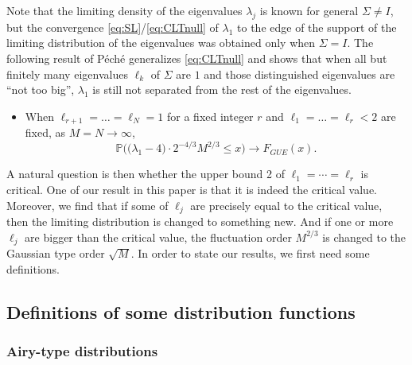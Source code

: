 \documentclass[11pt]{article}
\begin{document}
Note that the limiting density of the eigenvalues $\lambda_j$ is known for
general
$\Sigma \neq I$, but
the convergence \eqref{eq:SL}/\eqref{eq:CLTnull} of $\lambda_1$ to the edge of
the support of the limiting distribution of the eigenvalues
was obtained only when $\Sigma=I$.
The following result of P{\'e}ch{\'e} \cite{Sandrine} generalizes
\eqref{eq:CLTnull}
and shows that when
all but finitely many eigenvalues $\ell_k$ of $\Sigma$ are $1$
and those distinguished eigenvalues are ``not too big'',
$\lambda_1$ is still not separated from the rest of the eigenvalues.

\begin{itemize}
\item
When $\ell_{r+1}=\dots=\ell_N=1$ for a fixed integer
$r$ and $\ell_1=\dots=\ell_r<2$ are fixed,
 as $M=N\to\infty$,
\cite{Sandrine}
\begin{equation}
  \mathbb{P} \bigl( \bigr( \lambda_1 - 4 \bigr) \cdot
  2^{-4/3}M^{2/3} \le x \bigr)
  \to F_{GUE}(x).
\end{equation}
\end{itemize}

A natural question is then whether the upper bound 2 of
$\ell_1=\cdots =\ell_r$ is critical. One of our result in this
paper is that it is indeed the critical value. Moreover, we find
that if some of $\ell_j$ are precisely equal to the critical
value, then the limiting distribution is changed to something new.
And if one or more $\ell_j$ are bigger than the critical value,
the fluctuation order $M^{2/3}$ is changed to the Gaussian type
order $\sqrt{M}$. In order to state our results, we first need
some definitions.




\subsection{Definitions of some distribution functions}



\subsubsection{Airy-type distributions}
\end{document}
